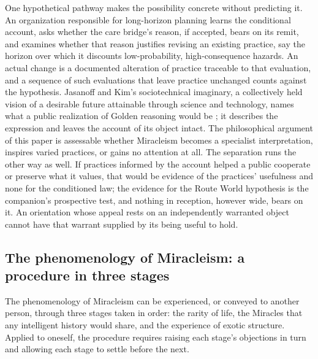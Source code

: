 One hypothetical pathway makes the possibility concrete without predicting
it. An organization responsible for long-horizon planning learns the
conditional account, asks whether the care bridge's reason, if accepted,
bears on its remit, and examines whether that reason justifies revising an
existing practice, say the horizon over which it discounts low-probability,
high-consequence hazards. An actual change is a documented alteration of
practice traceable to that evaluation, and a sequence of such evaluations
that leave practice unchanged counts against the hypothesis. Jasanoff and
Kim's sociotechnical imaginary, a collectively held vision of a desirable
future attainable through science and technology, names what a public
realization of Golden reasoning would be \cite{JasanoffKim15}; it describes
the expression and leaves the account of its object intact. The philosophical
argument of this paper is assessable whether Miracleism becomes a specialist
interpretation, inspires varied practices, or gains no attention at all.
The separation runs the other way as well. If practices informed by the
account helped a public cooperate or preserve what it values, that would be
evidence of the practices' usefulness and none for the conditioned law; the
evidence for the Route World hypothesis is the companion's prospective test,
and nothing in reception, however wide, bears on it. An orientation whose
appeal rests on an independently warranted object cannot have that warrant
supplied by its being useful to hold.

\subsection*{The phenomenology of Miracleism: a procedure in three stages}

The phenomenology of Miracleism can be experienced, or conveyed to another
person, through three stages taken in order: the rarity of life, the
Miracles that any intelligent history would share, and the experience of
exotic structure. Applied to oneself, the procedure requires raising each
stage's objections in turn and allowing each stage to settle before the
next.

